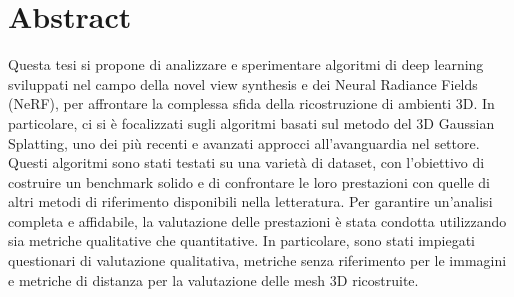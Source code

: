 \chapter*{Abstract} %
Questa tesi si propone di analizzare e sperimentare algoritmi di deep learning sviluppati nel campo della novel view synthesis e dei Neural Radiance Fields (NeRF), per affrontare la complessa sfida della ricostruzione di ambienti 3D. In particolare, ci si è focalizzati sugli algoritmi basati sul metodo del 3D Gaussian Splatting, uno dei più recenti e avanzati approcci all’avanguardia nel settore. Questi algoritmi sono stati testati su una varietà di dataset, con l’obiettivo di costruire un benchmark solido e di confrontare le loro prestazioni con quelle di altri metodi di riferimento disponibili nella letteratura. Per garantire un’analisi completa e affidabile, la valutazione delle prestazioni è stata condotta utilizzando sia metriche qualitative che quantitative. In particolare, sono stati impiegati questionari di valutazione qualitativa,  metriche senza riferimento per le immagini e metriche di distanza per la valutazione delle mesh 3D ricostruite.
